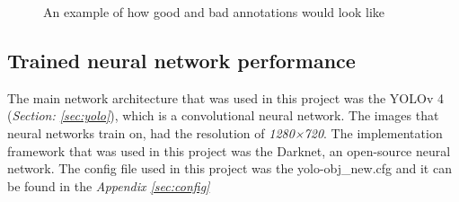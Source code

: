 \begin{figure}[h]
    \centering
    \hfill
    \caption{An example of how good and bad annotations would look like}
    \label{figure: goodandbad}
\end{figure}
\vspace{1cm}

\subsection{Trained neural network performance}
The main network architecture that was used in this project was the YOLOv 4 (\textit{Section: \ref{sec:yolo}}), which is a convolutional neural network.
The images that neural networks train on, had the resolution of \textit{1280×720}. The implementation framework that was used in this project was the Darknet, an open-source neural network\cite{alexey_alexeyabdarknet_2021}. The config file used in this project was the  yolo-obj\_new.cfg and it can be found in the \textit{Appendix \ref{sec:config}}


